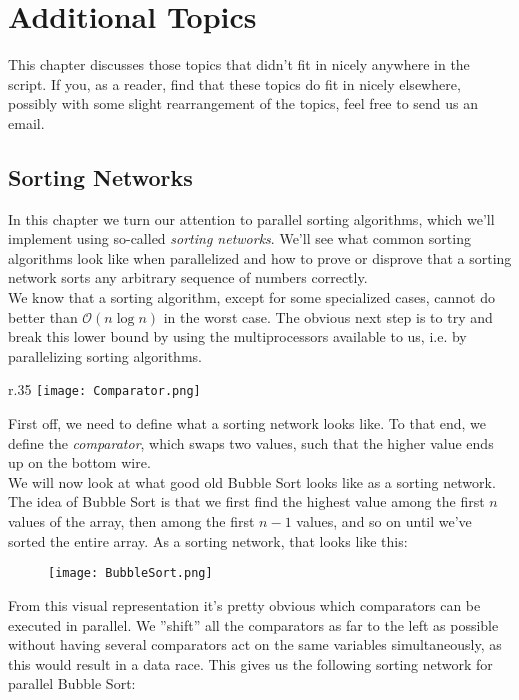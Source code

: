 \documentclass[main]{subfiles}
\begin{document}
\section{Additional Topics}
This chapter discusses those topics that didn't fit in nicely anywhere in the script. If you, as a reader, find that these topics do fit in nicely elsewhere, possibly with some slight rearrangement of the topics, feel free to send us an email.

\subsection{Sorting Networks}
In this chapter we turn our attention to parallel sorting algorithms, which we'll implement using so-called \textit{sorting networks}. We'll see what common sorting algorithms look like when parallelized and how to prove or disprove that a sorting network sorts any arbitrary sequence of numbers correctly.\\[3mm]
We know that a sorting algorithm, except for some specialized cases, cannot do better than $\mathcal{O}(n\log n)$ in the worst case. The obvious next step is to try and break this lower bound by using the multiprocessors available to us, i.e. by parallelizing sorting algorithms.\\[3mm]
\begin{wrapfigure}{r}{.35\textwidth}
    \centering
    \vspace{-15pt}
    \texttt{[image: Comparator.png]}
\end{wrapfigure}
First off, we need to define what a sorting network looks like. To that end, we define the \textit{comparator}, which swaps two values, such that the higher value ends up on the bottom wire.\\[3mm]
We will now look at what good old Bubble Sort looks like as a sorting network. The idea of Bubble Sort is that we first find the highest value among the first $n$ values of the array, then among the first $n-1$ values, and so on until we've sorted the entire array. As a sorting network, that looks like this:
\begin{figure}[H]
    \centering
    \texttt{[image: BubbleSort.png]}
\end{figure}
\noindent From this visual representation it's pretty obvious which comparators can be executed in parallel. We ''shift'' all the comparators as far to the left as possible without having several comparators act on the same variables simultaneously, as this would result in a data race. This gives us the following sorting network for parallel Bubble Sort:
\end{document}
